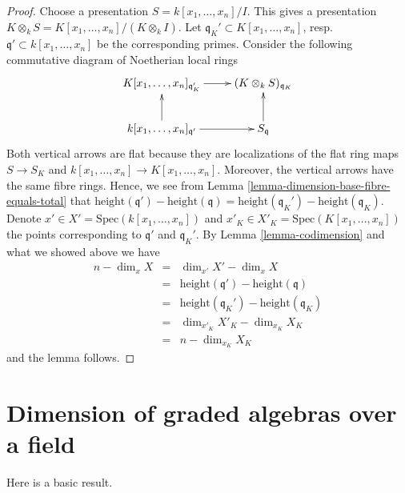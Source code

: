 \begin{proof}
Choose a presentation $S = k[x_1, \ldots, x_n]/I$.
This gives a presentation
$K \otimes_k S = K[x_1, \ldots, x_n]/(K\otimes_k I)$.
Let $\mathfrak q_K' \subset K[x_1, \ldots, x_n]$,
resp.\ $\mathfrak q' \subset k[x_1, \ldots, x_n]$ be
the corresponding primes. Consider the following
commutative diagram of Noetherian local rings
$$
\xymatrix{
K[x_1, \ldots, x_n]_{\mathfrak q_K'} \ar[r] &
(K \otimes_k S)_{\mathfrak q_K} \\
k[x_1, \ldots, x_n]_{\mathfrak q'} \ar[r] \ar[u] &
S_{\mathfrak q} \ar[u]
}
$$
Both vertical arrows are flat because they are localizations of
the flat ring maps $S \to S_K$ and
$k[x_1, \ldots, x_n] \to K[x_1, \ldots, x_n]$.
Moreover, the vertical arrows have the same fibre rings.
Hence, we see from
Lemma \ref{lemma-dimension-base-fibre-equals-total} that
$\text{height}(\mathfrak q') - \text{height}(\mathfrak q)
= \text{height}(\mathfrak q_K') - \text{height}(\mathfrak q_K)$.
Denote $x' \in X' = \text{Spec}(k[x_1, \ldots, x_n])$
and $x'_K \in X'_K = \text{Spec}(K[x_1, \ldots, x_n])$
the points corresponding to $\mathfrak q'$ and
$\mathfrak q_K'$. By Lemma \ref{lemma-codimension} and what we showed
above we have
\begin{eqnarray*}
n - \dim_x X & = & \dim_{x'} X' - \dim_x X \\
& = & \text{height}(\mathfrak q') - \text{height}(\mathfrak q) \\
& = & \text{height}(\mathfrak q_K') - \text{height}(\mathfrak q_K) \\
& = & \dim_{x'_K} X'_K - \dim_{x_K} X_K \\
& = & n - \dim_{x_K} X_K
\end{eqnarray*}
and the lemma follows.
\end{proof}








\section{Dimension of graded algebras over a field}
\label{section-dimension-graded}

\noindent
Here is a basic result.

